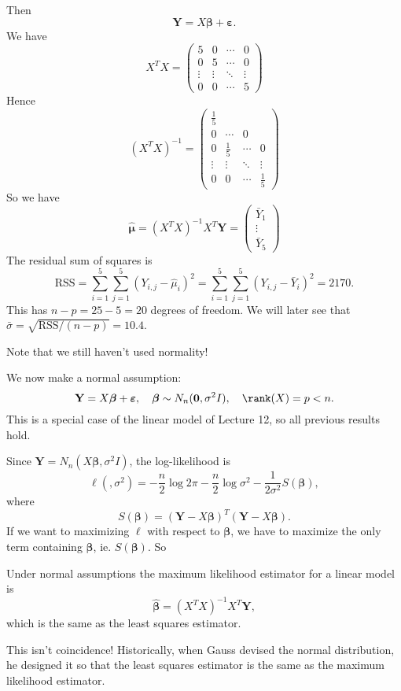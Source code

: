 \documentclass[a4paper]{article}
\begin{document}
\begin{eg}
\[  \]
  Then
  \[
    \mathbf{Y} = X\boldsymbol\beta + \boldsymbol\varepsilon.
  \]
  We have
  \[
    X^TX =
    \begin{pmatrix}
      5 & 0 & \cdots & 0\\
      0 & 5 & \cdots & 0\\
      \vdots & \vdots & \ddots & \vdots\\
      0 & 0 & \cdots & 5
    \end{pmatrix}
  \]
  Hence
  \[
    (X^TX)^{-1} =
    \begin{pmatrix}
      \frac{1}{5} \\ 0 & \cdots & 0\\
      0 & \frac{1}{5} & \cdots & 0\\
      \vdots & \vdots & \ddots & \vdots\\
      0 & 0 & \cdots & \frac{1}{5}
    \end{pmatrix}
  \]
  So we have
  \[
    \hat{\boldsymbol\mu} = (X^TX)^{-1}X^T\mathbf{Y} =
    \begin{pmatrix}
      \bar Y_1 \\\vdots\\ \bar Y_5
    \end{pmatrix}
  \]
  The residual sum of squares is
  \[
    \mathrm{RSS} = \sum_{i = 1}^5 \sum_{j = 1}^5 (Y_{i, j} - \hat{\mu}_i)^2 = \sum_{i = 1}^5 \sum_{j = 1}^5 (Y_{i, j} - \bar Y_i)^2 = 2170.
  \]
  This has $n - p = 25 - 5 = 20$ degrees of freedom. We will later see that $\bar \sigma = \sqrt{\mathrm{RSS}/(n - p)} = 10.4$.

  Note that we still haven't used normality!
\end{eg}

We now make a normal assumption:
\[
  \mathbf{Y} = X\boldsymbol\beta + \boldsymbol\varepsilon,\quad \boldsymbol\beta\sim N_n(\mathbf{0}, \sigma^2 I),\quad \rank(X) = p < n.
\]
This is a special case of the linear model of Lecture 12, so all previous results hold.

Since $\mathbf{Y} = N_n(X\boldsymbol\beta, \sigma^2 I)$, the log-likelihood is
\[
  \ell(\boldsymbol, \sigma^2) = -\frac{n}{2}\log 2\pi - \frac{n}{2}\log \sigma^2 - \frac{1}{2\sigma^2}S(\boldsymbol\beta),
\]
where
\[
  S(\boldsymbol\beta) = (\mathbf{Y} - X\boldsymbol\beta)^T(\mathbf{Y} - X\boldsymbol\beta).
\]
If we want to maximizing $\ell$ with respect to $\boldsymbol\beta$, we have to maximize the only term containing $\boldsymbol\beta$, ie. $S(\boldsymbol\beta)$. So
\begin{prop}
  Under normal assumptions the maximum likelihood estimator for a linear model is
  \[
    \hat{\boldsymbol\beta} = (X^TX)^{-1}X^T\mathbf{Y},
  \]
  which is the same as the least squares estimator.
\end{prop}
This isn't coincidence! Historically, when Gauss devised the normal distribution, he designed it so that the least squares estimator is the same as the maximum likelihood estimator.
\end{document}

